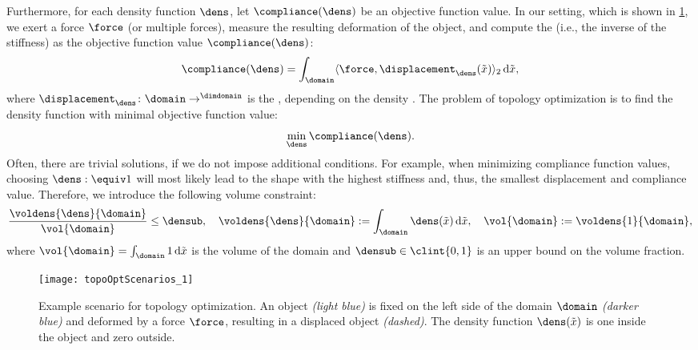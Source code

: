 Furthermore, for each density function $\dens$,
let $\compliance(\dens)$ be an objective function value.
In our setting, which is shown in \cref{fig:topoOptExampleScenario},
we exert a force $\force$ (or multiple forces),
measure the resulting deformation of the object, and
compute the  (i.e., the inverse of the stiffness) as
the objective function value $\compliance(\dens)$:
\begin{equation}
  \compliance(\dens)
  = \int_{\domain} \innerprod[2]{\force}{\displacement_{\dens}(\tilde{\*x})}
  \diff\tilde{\*x},
\end{equation}
where $\displacement_{\dens}\colon \domain \to \real^{\dimdomain}$
is the , depending on the density
\cite{Huebner14Mehrdimensionale}.
The problem of topology optimization is to find the density function
with minimal objective function value:
\begin{equation}
  \label{eq:topoOptProblemContinuous}
  \min_{\dens} \compliance(\dens).
\end{equation}
Often, there are trivial solutions, if we do not impose additional conditions.
For example, when minimizing compliance function values,
choosing $\dens :\equiv 1$ will most likely lead to the shape with the
highest stiffness and, thus, the smallest displacement and compliance value.
Therefore, we introduce the following volume constraint:
\begin{equation}
  \frac{\voldens{\dens}{\domain}}{\vol{\domain}} \le \densub,\quad
  \voldens{\dens}{\domain}
  := \int_{\domain} \dens(\tilde{\*x}) \diff\tilde{\*x},\quad
  \vol{\domain}
  := \voldens{1}{\domain},
\end{equation}
where $\vol{\domain} = \int_{\domain} 1 \diff\tilde{\*x}$
is the volume of the domain and
$\densub \in \clint{0, 1}$ is an upper bound on the volume fraction.

\begin{SCfigure}
  \texttt{[image: topoOptScenarios\_1]}%
  \caption[%
    Example scenario for topology optimization%
  ]{%
    Example scenario for topology optimization.
    An object \emph{\textcolor{hellblau}{(light blue)}}
    is fixed on the left side
    of the domain $\domain$
    \emph{\textcolor{mittelblau!50}{(darker blue)}}
    and deformed by a force $\force$, resulting in a displaced object
    \emph{(dashed)}.
    The density function $\dens(\tilde{\*x})$ is one inside the object
    and zero outside.%
  }%
  \label{fig:topoOptExampleScenario}%
\end{SCfigure}

